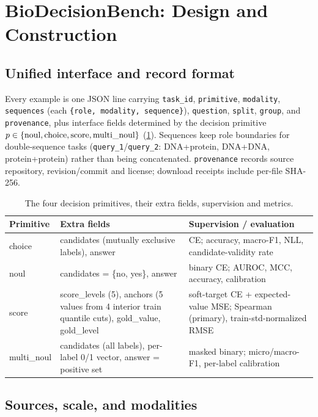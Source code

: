 \section{BioDecisionBench: Design and Construction}
\label{sec:benchmark}

\subsection{Unified interface and record format}
\label{sec:schema}

Every example is one JSON line carrying
\texttt{task\_id}, \texttt{primitive}, \texttt{modality}, \texttt{sequences}
(each \texttt{\{role, modality, sequence\}}), \texttt{question}, \texttt{split},
\texttt{group}, and \texttt{provenance}, plus interface fields determined by the decision primitive
$p\in\{\text{noul},\text{choice},\text{score},\text{multi\_noul}\}$
(\cref{tab:primitives}). Sequences keep role boundaries for double-sequence tasks
(\texttt{query\_1}/\texttt{query\_2}: DNA+protein, DNA+DNA, protein+protein) rather than
being concatenated. \texttt{provenance} records source repository, revision/commit and
license; download receipts include per-file SHA-256.

\begin{table}[t]
\centering
\caption{The four decision primitives, their extra fields, supervision and metrics.}
\label{tab:primitives}
\small
\footnotesize
\begin{tabular}{p{}p{}p{}}
\toprule
Primitive & Extra fields & Supervision / evaluation \\
\midrule
choice & candidates (mutually exclusive labels), answer
       & CE; accuracy, macro-F1, NLL, candidate-validity rate \\
noul & candidates = \{no, yes\}, answer
     & binary CE; AUROC, MCC, accuracy, calibration \\
score & score\_levels (5), anchors (5 values from 4 interior train quantile
        cuts), gold\_value, gold\_level
      & soft-target CE + expected-value MSE; Spearman (primary), train-std-normalized
        RMSE \\
multi\_noul & candidates (all labels), per-label 0/1 vector, answer = positive set
            & masked binary; micro/macro-F1, per-label calibration \\
\bottomrule
\end{tabular}
\end{table}

\subsection{Sources, scale, and modalities}
\label{sec:scale}

